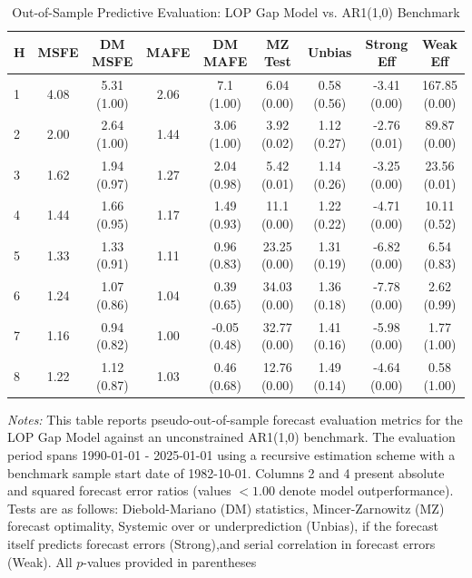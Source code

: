 \begin{table}[htbp]
\centering
\caption{Out-of-Sample Predictive Evaluation: LOP Gap Model vs. AR1(1,0) Benchmark}
\label{tab:lop_gap_model_evaluation}
\footnotesize
\begin{tabular}{l cccccccc}
\hline\hline
\rule{0pt}{3ex}
\textbf{H} & \textbf{MSFE} & \textbf{DM MSFE} & \textbf{MAFE} & \textbf{DM MAFE} & \textbf{MZ Test} & \textbf{Unbias} & \textbf{Strong Eff} & \textbf{Weak Eff} \\[0.5ex]
\hline
\rule{0pt}{2.5ex}
1 & 4.08 & 5.31 (1.00) & 2.06 & 7.1 (1.00) & 6.04 (0.00) & 0.58 (0.56) & -3.41 (0.00) & 167.85 (0.00) \\
2 & 2.00 & 2.64 (1.00) & 1.44 & 3.06 (1.00) & 3.92 (0.02) & 1.12 (0.27) & -2.76 (0.01) & 89.87 (0.00) \\
3 & 1.62 & 1.94 (0.97) & 1.27 & 2.04 (0.98) & 5.42 (0.01) & 1.14 (0.26) & -3.25 (0.00) & 23.56 (0.01) \\
4 & 1.44 & 1.66 (0.95) & 1.17 & 1.49 (0.93) & 11.1 (0.00) & 1.22 (0.22) & -4.71 (0.00) & 10.11 (0.52) \\
5 & 1.33 & 1.33 (0.91) & 1.11 & 0.96 (0.83) & 23.25 (0.00) & 1.31 (0.19) & -6.82 (0.00) & 6.54 (0.83) \\
6 & 1.24 & 1.07 (0.86) & 1.04 & 0.39 (0.65) & 34.03 (0.00) & 1.36 (0.18) & -7.78 (0.00) & 2.62 (0.99) \\
7 & 1.16 & 0.94 (0.82) & 1.00 & -0.05 (0.48) & 32.77 (0.00) & 1.41 (0.16) & -5.98 (0.00) & 1.77 (1.00) \\
8 & 1.22 & 1.12 (0.87) & 1.03 & 0.46 (0.68) & 12.76 (0.00) & 1.49 (0.14) & -4.64 (0.00) & 0.58 (1.00) \\
\hline\hline
\end{tabular}%
\par\smallskip
\parbox{\textwidth}{\scriptsize \textit{Notes:} This table reports pseudo-out-of-sample forecast evaluation metrics for the LOP Gap Model against an unconstrained AR1(1,0) benchmark. The evaluation period spans 1990-01-01 - 2025-01-01 using a recursive estimation scheme with a benchmark sample start date of 1982-10-01. Columns 2 and 4 present absolute and squared forecast error ratios (values $< 1.00$ denote model outperformance). Tests are as follows: Diebold-Mariano (DM) statistics, Mincer-Zarnowitz (MZ) forecast optimality, Systemic over or underprediction (Unbias), if the forecast itself predicts forecast errors (Strong),and serial correlation in forecast errors (Weak). All $p$-values provided in parentheses}
\end{table}
